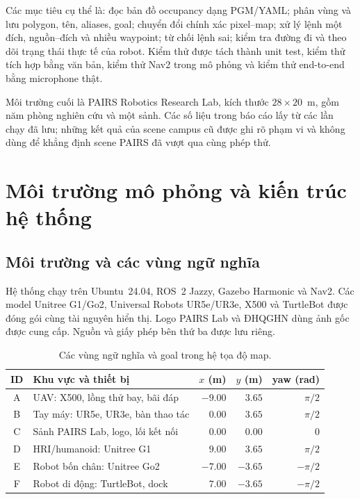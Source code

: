 \documentclass[12pt,a4paper]{article}
\begin{document}
Các mục tiêu cụ thể là: đọc bản đồ occupancy dạng PGM/YAML; phân vùng và
lưu polygon, tên, aliases, goal; chuyển đổi chính xác pixel--map; xử lý
lệnh một đích, nguồn--đích và nhiều waypoint; từ chối lệnh sai; kiểm tra
đường đi và theo dõi trạng thái thực tế của robot.
Kiểm thử được tách thành unit test, kiểm thử tích hợp bằng văn bản,
kiểm thử Nav2 trong mô phỏng và kiểm thử end-to-end bằng microphone thật.

Môi trường cuối là PAIRS Robotics Research Lab, kích thước $28\times20$~m,
gồm năm phòng nghiên cứu và một sảnh. Các số liệu trong báo cáo lấy từ
các lần chạy đã lưu; những kết quả của scene campus cũ được ghi rõ phạm
vi và không dùng để khẳng định scene PAIRS đã vượt qua cùng phép thử.

\section{Môi trường mô phỏng và kiến trúc hệ thống}
\subsection{Môi trường và các vùng ngữ nghĩa}
Hệ thống chạy trên Ubuntu~24.04, ROS~2 Jazzy, Gazebo Harmonic và Nav2.
Các model Unitree G1/Go2, Universal Robots UR5e/UR3e, X500 và TurtleBot
được đóng gói cùng tài nguyên hiển thị. Logo PAIRS Lab và ĐHQGHN dùng
ảnh gốc được cung cấp. Nguồn và giấy phép bên thứ ba được lưu riêng.

\begin{table}[H]
\centering\small
\caption{Các vùng ngữ nghĩa và goal trong hệ tọa độ map.}
\label{tab:regions}
\begin{tabularx}{\linewidth}{@{}cYrrr@{}}
\toprule
ID & Khu vực và thiết bị & $x$ (m) & $y$ (m) & yaw (rad) \\
\midrule
A & UAV: X500, lồng thử bay, bãi đáp & $-9.00$ & $3.65$ & $\pi/2$ \\
B & Tay máy: UR5e, UR3e, bàn thao tác & $0.00$ & $3.65$ & $\pi/2$ \\
C & Sảnh PAIRS Lab, logo, lối kết nối & $0.00$ & $0.00$ & $0$ \\
D & HRI/humanoid: Unitree G1 & $9.00$ & $3.65$ & $\pi/2$ \\
E & Robot bốn chân: Unitree Go2 & $-7.00$ & $-3.65$ & $-\pi/2$ \\
F & Robot di động: TurtleBot, dock & $7.00$ & $-3.65$ & $-\pi/2$ \\
\bottomrule
\end{tabularx}
\end{table}
\end{document}
